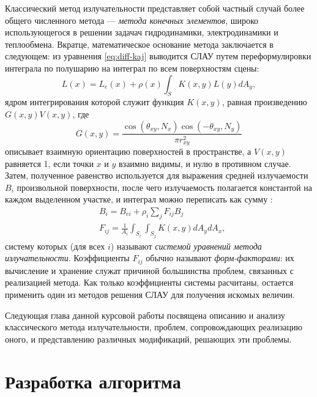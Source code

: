 \documentclass[12pt]{article}
\begin{document}
Классический метод излучательности представляет собой частный случай более общего численного метода --- \emph{метода конечных элементов}, широко использующегося в решении задачач гидродинамики, электродинамики и теплообмена. Вкратце, математическое основание метода заключается в следующем: из уравнения \eqref{eq:diff-kaj} выводится СЛАУ путем переформулировки интеграла по полушарию на интеграл по всем поверхностям сцены:
\begin{equation}
L(x) = L_e(x) + \rho(x) \int_S K(x, y) L(y) d A_y, \label{eq:kaj-surf}
\end{equation}
ядром интегрирования которой служит функция $K(x,y)$, равная произведению $G(x,y) V(x,y)$, где 
\begin{equation}
G(x,y) = \frac{\cos(\theta_{xy}, N_x) \cos(-\theta_{xy}, N_y)}{\pi r_{xy}^2}\label{eq:geom}
\end{equation}
описывает взаимную ориентацию поверхностей в пространстве, а $V(x,y)$ равняется 1, если точки $x$ и $y$ взаимно видимы, и нулю в противном случае. Затем, полученное равенство используется для выражения средней излучаемости $B_i$ произвольной поверхности, после чего излучаемость полагается константой на каждом выделенном участке, и интеграл можно переписать как сумму \cite{Coh93}:
\begin{equation}
\begin{split}
&B_i = B_{ei} + \rho_i \sum_j F_{ij} B_j\\
&F_{ij} = \frac{1}{A_i} \int_{S_i} \int_{S_j} K(x,y) dA_y dA_x, \label{eq:rad}
\end{split}
\end{equation}
систему которых (для всех $i$) называют \emph{системой уравнений метода излучательности}. Коэффициенты $F_{ij}$ обычно называют \emph{форм-факторами}: их вычисление и хранение служат причиной большинства проблем, связанных с реализацией метода. Как только коэффициенты системы расчитаны, остается применить один из методов решения СЛАУ для получения искомых величин.

Следующая глава данной курсовой работы посвящена описанию и анализу классического метода излучательности, проблем, сопровождающих реализацию оного, и представлению различных модификаций, решающих эти проблемы.
\newpage\section{Разработка алгоритма}
\end{document}
